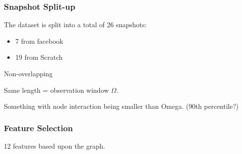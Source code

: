 \begin{frame}
\frametitle{Snapshot Split-up}
The dataset is split into a total of 26 snapshots:
\begin{itemize}
\item 7 from facebook
\item 19 from Scratch
\end{itemize}

Non-overlapping

Same length = observation window $\Omega$.

Something with node interaction being smaller than Omega. (90th percentile?)


\end{frame}

\begin{frame}
\frametitle{Feature Selection}
12 features based upon the graph.


\end{frame}
